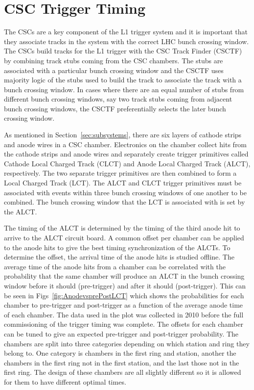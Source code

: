 \section{CSC Trigger Timing \label{sec:trigtime}}

The CSCs are a key component of the L1 trigger system and it is important that they associate tracks in the system with the correct LHC bunch crossing window.
The CSCs build tracks for the L1 trigger with the CSC Track Finder (CSCTF)~\cite{2003physics...6117A} by combining track stubs coming from the CSC chambers. 
The stubs are associated with a particular bunch crossing window and
the CSCTF uses majority logic of the stubs used to build the track to associate the track with a bunch crossing window. In cases where there are an equal number
of stubs from different bunch crossing windows, say two track stubs coming from adjacent bunch crossing windows, the CSCTF preferentially selects the later bunch crossing window.

As mentioned in Section~\ref{sec:subsystems}, there are six layers of cathode strips and anode wires in a CSC chamber.
Electronics on the chamber collect hits from the cathode strips and anode wires and separately create trigger primitives called Cathode Local Charged Track (CLCT)
and Anode Local Charged Track (ALCT), respectively. The two separate trigger primitives are then combined to form a Local Charged Track (LCT). The ALCT and CLCT trigger primitives
must be associated with events within three bunch crossing windows of one another to be combined.
The bunch crossing window that the LCT is associated with is set by the ALCT.

The timing of the ALCT is determined by the timing of the third anode hit 
to arrive to the ALCT circuit board. A common offset per chamber can be applied to the
anode hits to give the best timing synchronization of the ALCTs. To determine the offset, the arrival time of the anode hits is studied offline. The average time of the anode
hits from a chamber can be correlated with the probability that the same chamber will produce an ALCT in the bunch crossing 
window before it should (pre-trigger) and after it should (post-trigger).
This can be seen in Figs~\ref{fig:AnodevsprePostLCT} which shows the probabilities for each chamber to pre-trigger and post-trigger as a function of the average
anode time of each chamber. The data used in the plot was collected in 2010 before the full commissioning of the trigger timing was complete.
The offsets for each chamber can be tuned to give an expected pre-trigger and post-trigger probability.
The chambers are split into three categories depending on which station and ring they belong to. One category is chambers in the
first ring and station, another the chambers in the first ring not in the first station, and the last those not in the first ring. The design of these chambers are all
slightly different so it is allowed for them to have different optimal times.

